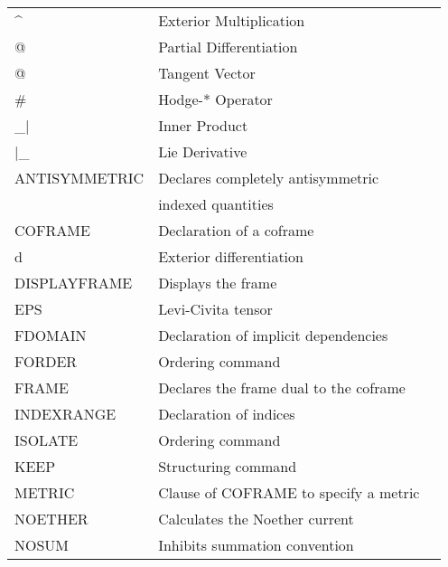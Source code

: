 \begin{table}
\begin{tabular}{l l r}
\index{"\^{} ! exterior multiplication} \index{wedge}
\^{ }  &  Exterior Multiplication & \pageref{wedge} \\
\index{"@ ! partial differentiation}
@  & Partial Differentiation & \pageref{at}  \\
\index{"@ ! tangent vector}
@  & Tangent Vector  & \pageref{at1}  \\
\index{"\# ! Hodge-* operator}
\#  & Hodge-* Operator & \pageref{hodge} \\
\index{\_$\mid$ operator}
\_$|$  & Inner Product  & \pageref{innerp} \\
\index{$\mid$\_ operator}
$|$\_  & Lie Derivative  & \pageref{lie}  \\
\index{ANTISYMMETRIC command}
ANTISYMMETRIC & Declares completely antisymmetric & \pageref{ANTISYMMETRIC} \\
  & indexed quantities & \\
\index{COFRAME command}
COFRAME & Declaration of a coframe & \pageref{COFRAME} \\
\index{d ! exterior differentiation}
d &  Exterior differentiation & \pageref{d} \\
\index{DISPLAYFRAME command}
DISPLAYFRAME & Displays the frame & \pageref{DISPLAYFRAME}\\
\index{EPS ! Levi-Civita tensor}
EPS & Levi-Civita tensor  & \pageref{EPS}  \\
\index{FDOMAIN command}
FDOMAIN & Declaration of implicit dependencies &\pageref{FDOMAIN} \\
\index{FORDER command}
FORDER & Ordering command  & \pageref{FORDER} \\
\index{FRAME command}
FRAME & Declares the frame dual to the coframe & \pageref{FRAME} \\
\index{INDEXRANGE command}
INDEXRANGE & Declaration of indices & \pageref{INDEXRANGE} \\
\index{ISOLATE command}
ISOLATE & Ordering command  & \pageref{ISOLATE} \\
\index{KEEP command}
KEEP & Structuring command  & \pageref{KEEP} \\
\index{METRIC command}
METRIC & Clause of COFRAME to specify a metric & \pageref{COFRAME} \\
\index{NOETHER function}
NOETHER & Calculates the Noether current & \pageref{NOETHER} \\
\index{NOSUM command}
NOSUM & Inhibits summation convention & \pageref{NOSUM} \\

\end{tabular}
\end{table}
